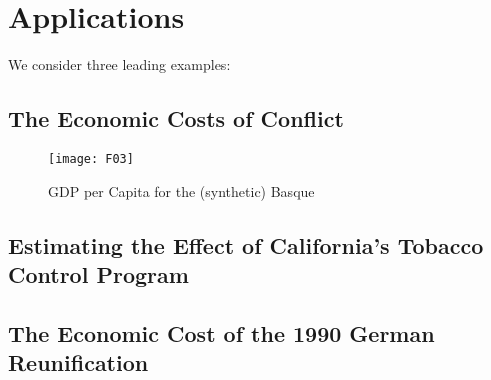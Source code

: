 \section{Applications}
We consider three leading examples:


\subsection{The Economic Costs of Conflict}
\cite{abadie:2003}
\begin{figure}[H]
	\centering
	\texttt{[image: F03]}
	\caption{GDP per Capita for the (synthetic) Basque}
	\label{F_03}
\end{figure}

\subsection{Estimating the Effect of California’s Tobacco Control Program}
\cite{abadie:2010}

\subsection{The Economic Cost of the 1990 German Reunification}
\cite{abadie:2015}